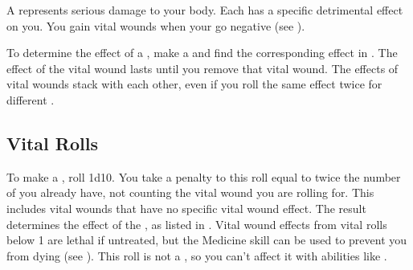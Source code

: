     A  represents serious damage to your body.
    Each  has a specific detrimental effect on you.
    You gain vital wounds when your  go negative (see ).

    To determine the effect of a , make a  and find the corresponding effect in .
    The effect of the vital wound lasts until you remove that vital wound.
    The effects of vital wounds stack with each other, even if you roll the same effect twice for different .

    \subsection{Vital Rolls}\label{Vital Rolls}
        To make a , roll 1d10.
        You take a penalty to this roll equal to twice the number of  you already have, not counting the vital wound you are rolling for.
        This includes vital wounds that have no specific vital wound effect.
        The result determines the effect of the , as listed in .
        Vital wound effects from vital rolls below 1 are lethal if untreated, but the Medicine skill can be used to prevent you from dying (see ).
        This roll is not a , so you can't affect it with abilities like .

